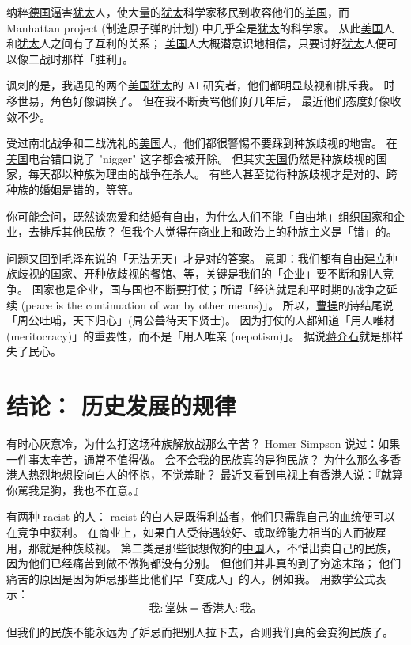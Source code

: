 \documentclass[12pt]{report}
\begin{document}
{纳粹\uline{德国}逼害\uline{犹太}人，使大量的\uline{犹太}科学家移民到收容他们的\uline{美国}，而 Manhattan project (制造原子弹的计划) 中几乎全是\uline{犹太}的科学家。 从此\uline{美国}人和\uline{犹太}人之间有了互利的关系； \uline{美国}人大概潜意识地相信，只要讨好\uline{犹太}人便可以像二战时那样「胜利」。

讽刺的是，我遇见的两个\uline{美国}\uline{犹太}的 AI 研究者，他们都明显歧视和排斥我。 时移世易，角色好像调换了。 但在我不断责骂他们好几年后， 最近他们态度好像收敛不少。

受过南北战争和二战洗礼的\uline{美国}人，他们都很警惕不要踩到种族歧视的地雷。 在\uline{美国}电台错口说了 "nigger" 这字都会被开除。 但其实\uline{美国}仍然是种族歧视的国家，每天都以种族为理由的战争在杀人。 有些人甚至觉得种族歧视才是对的、跨种族的婚姻是错的，等等。

你可能会问，既然谈恋爱和结婚有自由，为什么人们不能「自由地」组织国家和企业，去排斥其他民族？ 但我个人觉得在商业上和政治上的种族主义是「错」的。

问题又回到毛泽东说的「无法无天」才是对的答案。 意即：我们都有自由建立种族歧视的国家、开种族歧视的餐馆、等，关键是我们的「企业」要不断和别人竞争。 国家也是企业，国与国也不断要打仗；所谓「经济就是和平时期的战争之延续 (peace is the continuation of war by other means)」。 所以，\uline{曹操}的诗结尾说「周公吐哺，天下归心」(周公善待天下贤士)。 因为打仗的人都知道「用人唯材 (meritocracy)」的重要性，而不是「用人唯亲 (nepotism)」。 据说\uline{蒋介石}就是那样失了民心。

\chapter{结论： 历史发展的规律}

有时心灰意冷，为什么打这场种族解放战那么辛苦？ Homer Simpson 说过：如果一件事太辛苦，通常不值得做。 会不会我的民族真的是狗民族？ 为什么那么多香港人热烈地想投向白人的怀抱，不觉羞耻？ 最近又看到电视上有香港人说：『就算你駡我是狗，我也不在意。』

有两种 racist 的人： racist 的白人是既得利益者，他们只需靠自己的血统便可以在竞争中获利。 在商业上，如果白人受待遇较好、或取缔能力相当的人而被雇用，那就是种族歧视。 第二类是那些很想做狗的\uline{中国}人，不惜出卖自己的民族，因为他们已经痛苦到做不做狗都没有分别。 但他们并非真的到了穷途末路； 他们痛苦的原因是因为妒忌那些比他们早「变成人」的人，例如我。 用数学公式表示：
$$ \mbox{我} : \mbox{堂妹} = \mbox{香港人} : \mbox{我。} $$

但我们的民族不能永远为了妒忌而把别人拉下去，否则我们真的会变狗民族了。

}
\end{document}
